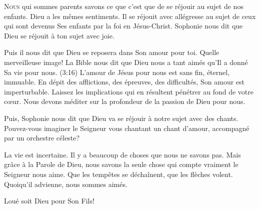 \dvrule






\lettrine{N}{ous} qui sommes parents savons ce que c'est que de se réjouir
 au sujet de nos enfants. Dieu a les mêmes sentiments.
 Il se réjouit avec allégresse au sujet de ceux qui sont devenus
 Ses enfants par la foi en Jésus-Christ. Sophonie nous dit que
 \Og Dieu se réjouit à ton sujet avec joie. \Fg{}

Puis il nous dit que Dieu \Og se reposera dans Son amour pour toi. \Fg{}
 Quelle merveilleuse image! La Bible nous dit que Dieu nous a tant aimés
 qu'Il a donné Sa vie pour nous. (3:16)
 L'amour de Jésus pour nous est sans fin, éternel, immuable.
 En dépit des afflictions, des épreuves, des difficultés,
 Son amour est imperturbable. Laissez les implications qui en résultent
 pénétrer  au fond de votre c\oe{}ur.
 Nous devons méditer sur la profondeur de la passion de Dieu pour nous. 


Puis, Sophonie nous dit que Dieu va \Og se réjouir à notre sujet
 avec des chants. \Fg{} Pouvez-vous imaginer le Seigneur vous chantant
 un chant d'amour, accompagné par un orchestre céleste? 

La vie est incertaine. Il y a beaucoup de choses que nous ne savons pas.
 Mais grâce à la Parole de Dieu, nous savons la seule chose
 qui compte vraiment\frcolon{} le Seigneur nous aime. Que les tempêtes se déchaînent,
 que les flèches volent. Quoiqu'il advienne, nous sommes aimés. 

Loué soit Dieu pour Son Fils! 

\dvrule



